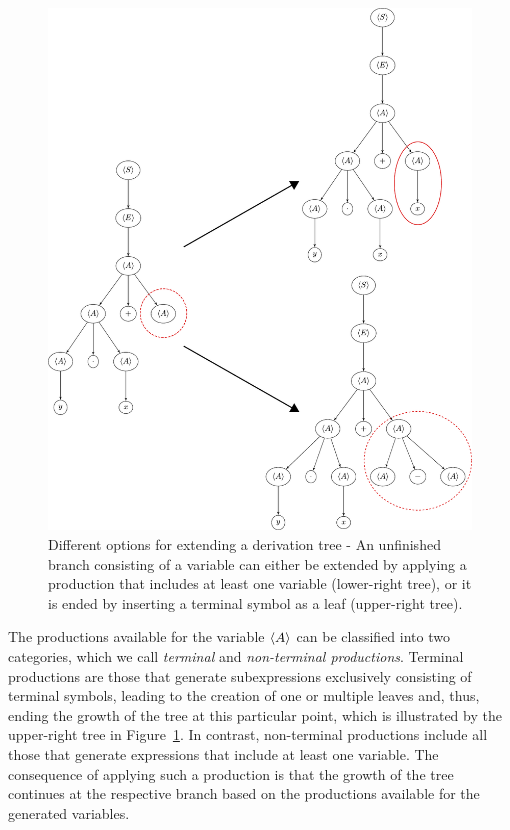 \begin{figure}
	\centering
	\includegraphics[scale=0.5]{figures/trees/gp_grow_tree_options.pdf}
	\caption{Different options for extending a derivation tree - An unfinished branch consisting of a variable can either be extended by applying a production that includes at least one variable (lower-right tree), or it is ended by inserting a terminal symbol as a leaf (upper-right tree).}
	\label{fig:gp-tree-growing-options}
\end{figure}
The productions available for the variable $\langle A \rangle$ can be classified into two categories, which we call \emph{terminal} and \emph{non-terminal productions}.
Terminal productions are those that generate subexpressions exclusively consisting of terminal symbols, leading to the creation of one or multiple leaves and, thus, ending the growth of the tree at this particular point, which is illustrated by the upper-right tree in Figure~\ref{fig:gp-tree-growing-options}.
In contrast, non-terminal productions include all those that generate expressions that include at least one variable.
The consequence of applying such a production is that the growth of the tree continues at the respective branch based on the productions available for the generated variables.
